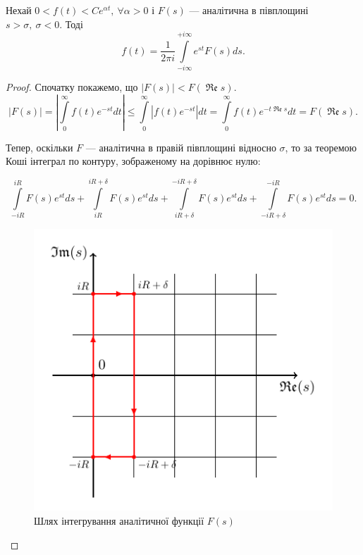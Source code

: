 \begin{corollary}
\label{eq:mellin_analytic}
Нехай $0 < f(t) < Ce^{\alpha t}, ~ \forall \alpha > 0$ і $F(s)$ --- аналітична в півплощині $s > \sigma, ~\sigma < 0$. Тоді
\begin{equation}
f(t) = \frac{1}{2\pi i}\int\limits_{- i\infty}^{+ i\infty} e^{st} F(s) ds.
\end{equation}
\begin{proof}
Спочатку покажемо, що $|F(s)| < F(\operatorname{\mathfrak{Re}} s)$.
\begin{equation*}
|F(s)| = \left| \int\limits_{0}^{\infty}  f(t) e^{-st} dt \right| \leq \int\limits_{0}^{\infty} \left|f(t) e^{-st} \right| dt = \int\limits_{0}^{\infty} f(t)  e^{-t\operatorname{\mathfrak{Re}} s}  dt = F(\operatorname{\mathfrak{Re}} s).
\end{equation*}

Тепер, оскільки $F$ --- аналітична в правій півплощині відносно $\sigma$, то за теоремою Коші \cite{lavrentiev1965} інтеграл по контуру, зображеному на  дорівнює нулю:


\begin{equation*}
\int\limits_{-iR}^{iR} F(s) e^{st} ds + \int\limits_{iR}^{iR + \delta} F(s) e^{st} ds + \int\limits_{iR + \delta}^{-iR + \delta} F(s) e^{st} ds + \int\limits_{-iR + \delta}^{-iR} F(s) e^{st} ds = 0.
\end{equation*}

\begin{figure}[h]
\centering
\includegraphics{chapter_Asymptotics/img/contour_mellin}
\caption{Шлях інтегрування аналітичної функції $F(s)$}
\label{fig:contour_mellin}
\end{figure}


\end{proof}
\end{corollary}
